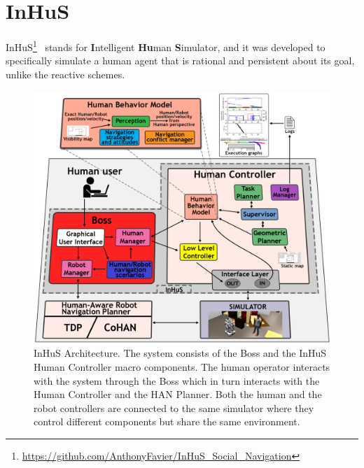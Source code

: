 \section{InHuS}
InHuS\footnote{\url{https://github.com/AnthonyFavier/InHuS_Social_Navigation}}~\cite{favier2022_hri} stands for \textbf{I}ntelligent \textbf{Hu}man \textbf{S}imulator, and it was developed to specifically simulate a human agent that is rational and persistent about its goal, unlike the reactive schemes. 
\begin{figure}[!hb]
    \centering
    \includegraphics[width=0.9\columnwidth]{images/appendix/architecture.pdf}
    \caption{InHuS Architecture. The system consists of the Boss and the InHuS Human Controller macro components. The human operator interacts with the system through the Boss which in turn interacts with the Human Controller and the HAN Planner. Both the human and the robot controllers are connected to the same simulator where they control different components but share the same environment.}
    \label{fig:inhus}
\end{figure}
